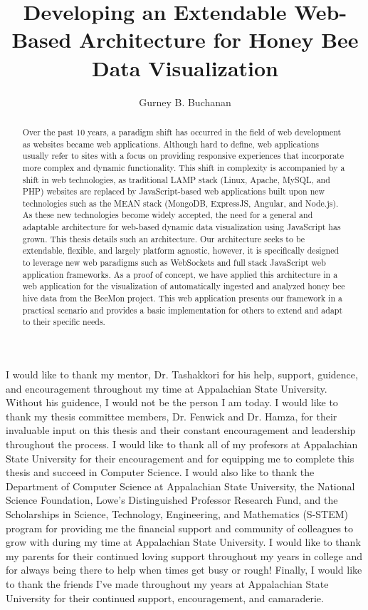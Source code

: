 \documentclass[12pt]{asu}
\title{Developing an Extendable Web-Based Architecture for Honey Bee Data Visualization}
\author{Gurney B. Buchanan}
\begin{document}
	\begin{preliminary}
		\maketitle
		\makeapproval
		\makecopyright
		\begin{abstract}
Over the past 10 years, a paradigm shift has occurred in the field of web development as websites became web applications.   Although hard to define, web applications usually refer to sites with a focus on providing responsive experiences that incorporate more complex and dynamic functionality.  This shift in complexity is accompanied by a shift in web technologies, as traditional LAMP stack (Linux, Apache, MySQL, and PHP) websites are replaced by JavaScript-based web applications built upon new technologies such as the MEAN stack (MongoDB, ExpressJS, Angular, and Node.js).  As these new technologies become widely accepted, the need for a general and adaptable architecture for web-based dynamic data visualization using JavaScript has grown.  This thesis details such an architecture. Our architecture seeks to be extendable, flexible, and largely platform agnostic, however, it is specifically designed to leverage new web paradigms such as WebSockets and full stack JavaScript web application frameworks.  As a proof of concept, we have applied this architecture in a web application for the visualization of automatically ingested and analyzed honey bee hive data from the BeeMon project.  This web application presents our framework in a practical scenario and provides a basic implementation for others to extend and adapt to their specific needs.
		\end{abstract}
		\begin{acknowledgement}
		I would like to thank my mentor, Dr. Tashakkori for his help, support, guidence, and encouragement throughout my time at Appalachian State University.  Without his guidence, I would not be the person I am today.  I would like to thank my thesis committee members, Dr. Fenwick and Dr. Hamza, for their invaluable input on this thesis and their constant encouragement and leadership throughout the process.  I would like to thank all of my profesors at Appalachian State University for their encouragement and for equipping me to complete this thesis and succeed in Computer Science.  I would also like to thank the Department of Computer Science at Appalachian State University, the National Science Foundation, Lowe's Distinguished Professor Research Fund, and the Scholarships in Science, Technology, Engineering, and Mathematics (S-STEM) program for providing me the financial support and community of colleagues to grow with during my time at Appalachian State University.  I would like to thank my parents for their continued loving support throughout my years in college and for always being there to help when times get busy or rough!  Finally, I would like to thank the friends I've made throughout my years at Appalachian State University for their continued support, encouragement, and camaraderie.
		\end{acknowledgement}
		\tableofcontents
		\listoffigures
	\end{preliminary}
\end{document}

